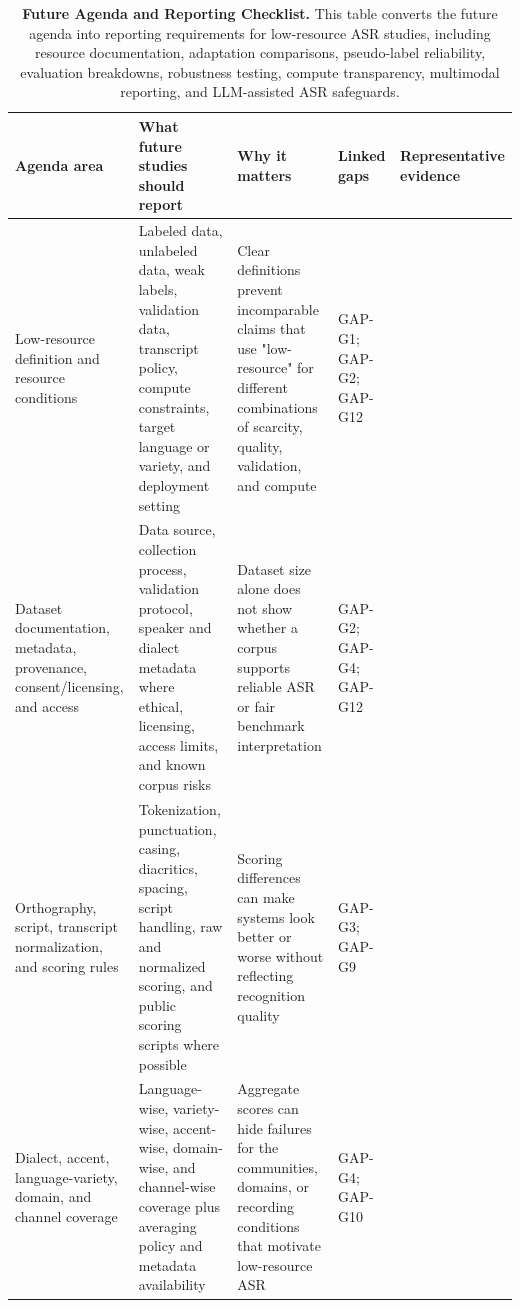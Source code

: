 \documentclass[pdflatex,sn-basic]{sn-jnl}
\theoremstyle{thmstyleone}
\theoremstyle{thmstyletwo}
\theoremstyle{thmstylethree}
\begin{document}
\begin{table}[htbp]
\setcounter{table}{5}
\small
\centering
\caption{\textbf{Future Agenda and Reporting Checklist.} This table converts the future agenda into reporting requirements for low-resource ASR studies, including resource documentation, adaptation comparisons, pseudo-label reliability, evaluation breakdowns, robustness testing, compute transparency, multimodal reporting, and LLM-assisted ASR safeguards.}
\label{tab:6}
\begin{tabularx}{\textwidth}{YYYYY}
\toprule
\textbf{Agenda area} & \textbf{What future studies should report} & \textbf{Why it matters} & \textbf{Linked gaps} & \textbf{Representative evidence} \\
\midrule
Low-resource definition and resource conditions & Labeled data, unlabeled data, weak labels, validation data, transcript policy, compute constraints, target language or variety, and deployment setting & Clear definitions prevent incomparable claims that use "low-resource" for different combinations of scarcity, quality, validation, and compute & GAP-G1; GAP-G2; GAP-G12 & \citep{besacier2014_underresourced_asr_survey,peterson2022_openasr21,chen2025mlsuperb2challenge} \\
Dataset documentation, metadata, provenance, consent/licensing, and access & Data source, collection process, validation protocol, speaker and dialect metadata where ethical, licensing, access limits, and known corpus risks & Dataset size alone does not show whether a corpus supports reliable ASR or fair benchmark interpretation & GAP-G2; GAP-G4; GAP-G12 & \citep{ardila2020commonvoice,lau2025_data_quality_multilingual_speech,gebru2021_datasheets_for_datasets,bender2018_data_statements} \\
Orthography, script, transcript normalization, and scoring rules & Tokenization, punctuation, casing, diacritics, spacing, script handling, raw and normalized scoring, and public scoring scripts where possible & Scoring differences can make systems look better or worse without reflecting recognition quality & GAP-G3; GAP-G9 & \citep{karita2023lenient,thennal2024cer,lau2025_data_quality_multilingual_speech} \\
Dialect, accent, language-variety, domain, and channel coverage & Language-wise, variety-wise, accent-wise, domain-wise, and channel-wise coverage plus averaging policy and metadata availability & Aggregate scores can hide failures for the communities, domains, or recording conditions that motivate low-resource ASR & GAP-G4; GAP-G10 & \citep{shi2023mlsuperb,chen2025mlsuperb2challenge,olatunji2023_afrispeech200,koenecke2020racialdisparities} \\

\end{tabularx}
\end{table}
\end{document}
